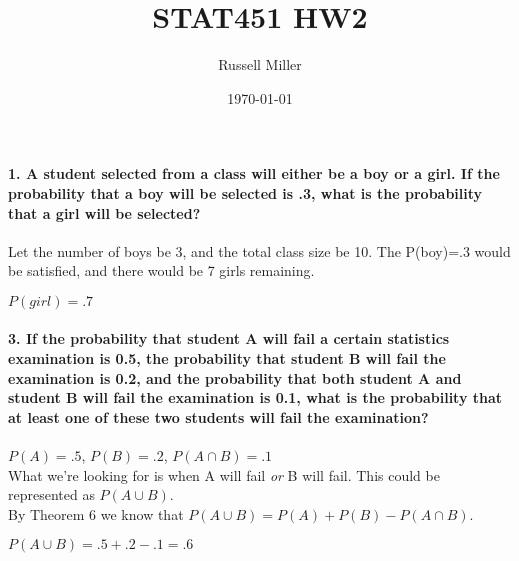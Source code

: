 \documentclass{article}
\title{STAT451 HW2}
\author{Russell Miller}
\date{\today}
\begin{document}
\maketitle

\paragraph{1. A student selected from a class will either be a boy or a girl. 
If the probability that a boy will be selected is .3, what is the probability
that a girl will be selected?\\}
Let the number of boys be 3, and the total class size be 10. The P(boy)=.3
would be satisfied, and there would be 7 girls remaining.
\begin{center}
$\boxed{P(girl)=.7}$
\end{center}

\paragraph{3. If the probability that student A will fail a certain statistics
examination is 0.5, the probability that student B will fail the examination
is 0.2, and the probability that both student A and student B will fail the
examination is 0.1, what is the probability that at least one of these two
students will fail the examination?\\}
$P(A)=.5$, $P(B)=.2$, $P(A\cap B)=.1$\\
What we're looking for is when A will fail \emph{or} B will fail.
This could be represented as $P(A \cup B)$.\\
By Theorem 6 we know that $P(A \cup B) = P(A) + P(B) - P(A \cap B)$.
\begin{center}
$\boxed{P(A \cup B) = .5+.2-.1=.6}$
\end{center}
\end{document}
